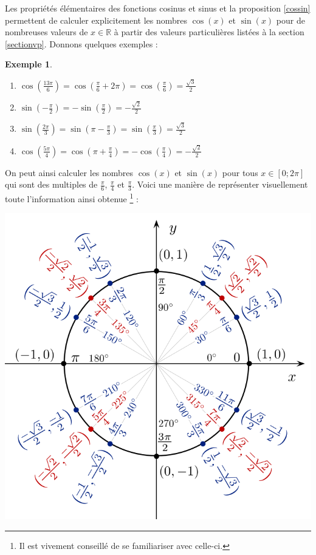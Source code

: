 \documentclass[a4paper,fontsize=13pt]{scrreprt}
\theoremstyle{plain}
\theoremstyle{definition}
\newtheorem{exe}[subsection]{Exemple}
\newcommand{\rr}{\mathbb{R}}
\begin{document}
Les propriétés élémentaires des fonctions cosinus et sinus et la proposition \ref{cossin} permettent de calculer explicitement les nombres $\cos(x)$ et $\sin(x)$ pour de nombreuses valeurs de $x \in \rr$ à partir des valeurs particulières listées à la section \ref{sectionvp}. Donnons quelques exemples :
\newpage
\begin{exe}
\begin{enumerate}
\item $\cos(\frac{13\pi}{6}) = \cos(\frac{\pi}{6}+2\pi) = \cos(\frac{\pi}{6}) = \frac{\sqrt{3}}{2}$
\item $\sin(-\frac{\pi}{2}) = -\sin(\frac{\pi}{2}) = - \frac{\sqrt{2}}{2}$
\item $\sin(\frac{2\pi}{3}) = \sin(\pi -\frac{\pi}{3}) =  \sin(\frac{\pi}{3})=\frac{\sqrt{3}}{2}$
\item $\cos(\frac{5\pi}{4}) = \cos(\pi +\frac{\pi}{4}) =  -\cos(\frac{\pi}{4})=-\frac{\sqrt{2}}{2}$
\end{enumerate}
\end{exe}
On peut ainsi calculer les nombres $\cos(x)$ et $\sin(x)$ pour tous $x \in [0;2\pi]$ qui sont des multiples de $\frac{\pi}{6}$, $\frac{\pi}{4}$ et $\frac{\pi}{3}$. Voici une manière de représenter visuellement toute l'information ainsi obtenue \footnote{Il est vivement conseillé de se familiariser avec celle-ci.} :
\begin{center}
\includegraphics[scale=0.8]{vp}
\end{center}
\end{document}
